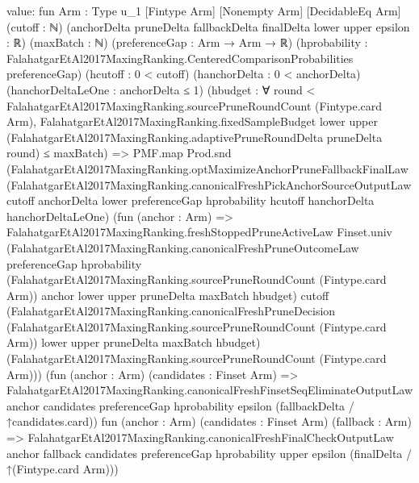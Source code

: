 \documentclass[10pt]{article}
\begin{document}
\begin{ReviewVerbatim}
value:
fun {Arm : Type u_1} [Fintype Arm] [Nonempty Arm] [DecidableEq Arm] (cutoff : ℕ)
    (anchorDelta pruneDelta fallbackDelta finalDelta lower upper epsilon : ℝ) (maxBatch : ℕ)
    (preferenceGap : Arm → Arm → ℝ)
    (hprobability : FalahatgarEtAl2017MaxingRanking.CenteredComparisonProbabilities preferenceGap)
    (hcutoff : 0 < cutoff) (hanchorDelta : 0 < anchorDelta) (hanchorDeltaLeOne : anchorDelta ≤ 1)
    (hbudget :
      ∀ round < FalahatgarEtAl2017MaxingRanking.sourcePruneRoundCount (Fintype.card Arm),
        FalahatgarEtAl2017MaxingRanking.fixedSampleBudget lower upper
            (FalahatgarEtAl2017MaxingRanking.adaptivePruneRoundDelta pruneDelta round) ≤
          maxBatch) =>
  PMF.map Prod.snd
    (FalahatgarEtAl2017MaxingRanking.optMaximizeAnchorPruneFallbackFinalLaw
      (FalahatgarEtAl2017MaxingRanking.canonicalFreshPickAnchorSourceOutputLaw cutoff anchorDelta lower preferenceGap
        hprobability hcutoff hanchorDelta hanchorDeltaLeOne)
      (fun (anchor : Arm) =>
        FalahatgarEtAl2017MaxingRanking.freshStoppedPruneActiveLaw Finset.univ
          (FalahatgarEtAl2017MaxingRanking.canonicalFreshPruneOutcomeLaw preferenceGap hprobability
            (FalahatgarEtAl2017MaxingRanking.sourcePruneRoundCount (Fintype.card Arm)) anchor lower upper pruneDelta
            maxBatch hbudget)
          cutoff
          (FalahatgarEtAl2017MaxingRanking.canonicalFreshPruneDecision
            (FalahatgarEtAl2017MaxingRanking.sourcePruneRoundCount (Fintype.card Arm)) lower upper pruneDelta maxBatch
            hbudget)
          (FalahatgarEtAl2017MaxingRanking.sourcePruneRoundCount (Fintype.card Arm)))
      (fun (anchor : Arm) (candidates : Finset Arm) =>
        FalahatgarEtAl2017MaxingRanking.canonicalFreshFinsetSeqEliminateOutputLaw anchor candidates preferenceGap
          hprobability epsilon (fallbackDelta / ↑candidates.card))
      fun (anchor : Arm) (candidates : Finset Arm) (fallback : Arm) =>
      FalahatgarEtAl2017MaxingRanking.canonicalFreshFinalCheckOutputLaw anchor fallback candidates preferenceGap
        hprobability upper epsilon (finalDelta / ↑(Fintype.card Arm)))
\end{ReviewVerbatim}
\end{document}
